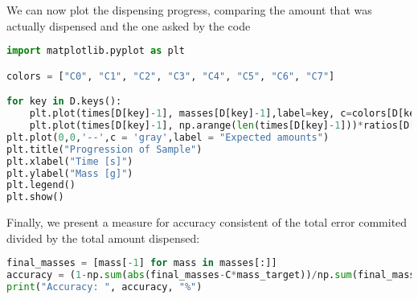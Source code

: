 We can now plot the dispensing progress, comparing the amount that was
actually dispensed and the one asked by the code

\begin{lstlisting}[language=Python]
import matplotlib.pyplot as plt

colors = ["C0", "C1", "C2", "C3", "C4", "C5", "C6", "C7"] 

for key in D.keys():
    plt.plot(times[D[key]-1], masses[D[key]-1],label=key, c=colors[D[key]-1])
    plt.plot(times[D[key]-1], np.arange(len(times[D[key]-1]))*ratios[D[key]-1], '--',c=colors[D[key]-1])
plt.plot(0,0,'--',c = 'gray',label = "Expected amounts")
plt.title("Progression of Sample")
plt.xlabel("Time [s]")
plt.ylabel("Mass [g]")
plt.legend()
plt.show()
\end{lstlisting}

Finally, we present a measure for accuracy consistent of the total error
commited divided by the total amount dispensed:

\begin{lstlisting}[language=Python]
final_masses = [mass[-1] for mass in masses[:]]
accuracy = (1-np.sum(abs(final_masses-C*mass_target))/np.sum(final_masses))*100
print("Accuracy: ", accuracy, "%")
\end{lstlisting}

\begin{lstlisting}[language=Python]
\end{lstlisting}
